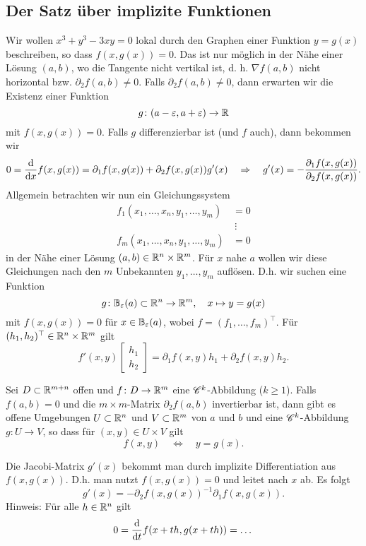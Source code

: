 \subsection{Der Satz über implizite Funktionen}
Wir wollen $x^3 + y^3 - 3xy = 0$ lokal durch den Graphen einer Funktion $y=g(x)$ beschreiben, so dass $f(x,g(x)) = 0$. Das ist nur möglich in der Nähe einer Lösung $(a,b)$, wo die Tangente nicht vertikal ist, d. h. $\nabla f(a,b)$ nicht horizontal bzw. $\partial_2 f(a,b) \neq 0$. Falls $\partial_2 f(a,b) \neq 0$, dann erwarten wir die Existenz einer Funktion
\[g \colon (a-\varepsilon, a + \varepsilon) \to \mathbb{R}\]
mit $f(x,g(x)) = 0$. Falls $g$ differenzierbar ist (und $f$ auch), dann bekommen wir
\[0 = \frac{\mathrm{d}}{\mathrm{d} x} f(x,g(x)) = \partial_1 f(x,g(x)) + \partial_2 f(x, g(x)) g'(x)\quad\Rightarrow\quad g'(x) = -\frac{\partial_1 f(x,g(x))}{\partial_2 f(x,g(x))}.\]
Allgemein betrachten wir nun ein Gleichungssystem
\begin{align*}
	f_1(x_1, \dots, x_n, y_1, \dots, y_m) &= 0\\
	&~\vdots\\
	f_m(x_1, \dots,x_n, y_1, \dots, y_m) &= 0
\end{align*}
in der Nähe einer Lösung $(a,b) \in \mathbb{R}^n \times \mathbb{R}^m$. Für $x$ nahe $a$ wollen wir diese Gleichungen nach den $m$ Unbekannten $y_1, \dots, y_m$ auflösen. D.h. wir suchen eine Funktion
\[g \colon \mathbb{B}_\varepsilon(a) \subset \mathbb{R}^n \to \mathbb{R}^m,\quad x \mapsto y = g(x)\]
mit $f(x,g(x)) = 0$ für $x \in \mathbb{B}_\varepsilon(a)$, wobei $f = (f_1, \dots, f_m)^\top$. Für $(h_1, h_2)^\top \in \mathbb{R}^n \times \mathbb{R}^m$ gilt
\[f'(x,y) \begin{bmatrix}
	h_1\\
	h_2
\end{bmatrix} = \partial_1 f(x,y)h_1 + \partial_2 f(x,y)h_2.\]
\begin{thm}\label{thm1_5}
	Sei $D \subset \mathbb{R}^{m+n}$ offen und $f \colon D \to \mathbb{R}^m$ eine $\mathscr{C}^k$-Abbildung ($k\geq 1$). Falls $f(a,b) = 0$ und die $m \times m$-Matrix $\partial_2 f(a,b)$ invertierbar ist, dann gibt es offene Umgebungen $U \subset \mathbb{R}^n$ und $V \subset \mathbb{R}^m$ von $a$ und $b$ und eine $\mathscr{C}^k$-Abbildung $g \colon U \to V$, so dass für $(x,y) \in U \times V$ gilt
	\[f(x,y) \quad\Leftrightarrow\quad y = g(x).\]
\end{thm}
\begin{rem}
	Die Jacobi-Matrix $g'(x)$ bekommt man durch implizite Differentiation aus $f(x,g(x))$. D.h. man nutzt $f(x,g(x)) = 0$ und leitet nach $x$ ab. Es folgt
	\[g'(x) = -\partial_2 f(x,g(x))^{-1} \partial_1 f(x,g(x)).\]
	Hinweis: Für alle $h \in \mathbb{R}^n$ gilt
	\[0 = \frac{\mathrm{d}}{\mathrm{d} t} f(x + th, g(x+th)) =\dots\]
\end{rem}

